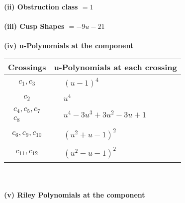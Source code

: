 \documentclass[1p]{elsarticle_modified}
\theoremstyle{definition}
\begin{document}
\flushleft \textbf{(ii) Obstruction class $= 1$}\\~\\
\flushleft \textbf{(iii) Cusp Shapes $= -9 u-21$}\\~\\
\newpage\renewcommand{\arraystretch}{1}
\flushleft \textbf{(iv) u-Polynomials at the component}\newline \\
\begin{tabular}{m{50pt}|m{274pt}}
Crossings & \hspace{64pt}u-Polynomials at each crossing \\
\hline $$\begin{aligned}c_{1},c_{3}\end{aligned}$$&$\begin{aligned}
&(u-1)^4
\end{aligned}$\\
\hline $$\begin{aligned}c_{2}\end{aligned}$$&$\begin{aligned}
&u^4
\end{aligned}$\\
\hline $$\begin{aligned}c_{4},c_{5},c_{7}\\c_{8}\end{aligned}$$&$\begin{aligned}
&u^4-3 u^3+3 u^2-3 u+1
\end{aligned}$\\
\hline $$\begin{aligned}c_{6},c_{9},c_{10}\end{aligned}$$&$\begin{aligned}
&(u^2+u-1)^2
\end{aligned}$\\
\hline $$\begin{aligned}c_{11},c_{12}\end{aligned}$$&$\begin{aligned}
&(u^2- u-1)^2
\end{aligned}$\\
\hline
\end{tabular}\\~\\
\newpage\renewcommand{\arraystretch}{1}
\flushleft \textbf{(v) Riley Polynomials at the component}\newline \\
\end{document}
